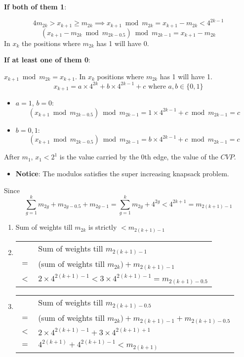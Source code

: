 \documentclass[article,10pt]{beamer}%
\begin{document}
\begin{frame}[allowframebreaks]
\begin{itemize}
	\end{itemize}
\framebreak

 \textbf{If both of them 1}:
 
  $$4m_{2k}>x_{k+1}\geq m_{2k}\implies x_{k+1}\bmod{m_{2k}}=x_{k+1}-m_{2k}<4^{2k-1}$$  $$(x_{k+1}-m_{2k}\bmod{m_{2k-0.5}})\bmod{m_{2k-1}}=x_{k+1}-m_{2k}$$ In $x_k$ the positions where $m_{2k}$ has 1 will have 0.
  \framebreak
  
\textbf{If at least one of them 0}:

 $x_{k+1}\bmod{m_{2k}}=x_{k+1}$. In $x_k$ positions where $m_{2k}$ has 1 will have 1. $$x_{k+1}=a\times 4^{2k}+b\times 4^{2k-1}+c\text{ where }a,b\in \{0,1\}$$\begin{itemize}
	\item $a=1$, $b=0$: $$(x_{k+1}\bmod{m_{2k-0.5}})\bmod{m_{2k-1}}=1\times 4^{2k-1}+c\bmod{m_{2k-1}}=c$$
	\item $b=0,1$: $$(x_{k+1}\bmod{m_{2k-0.5}})\bmod{m_{2k-1}}=b\times 4^{2k-1}+c\bmod{m_{2k-1}}=c$$
\end{itemize}
\framebreak

After $m_1$, $x_1<2^1$ is the value carried by the 0th edge, the value of the $CVP$.

\begin{itemize}
	\item  \textbf{Notice}: The modulos  satisfies the super increasing knapsack problem. 
\end{itemize} 
 Since $$\sum\limits_{g=1}^{k}m_{2g}+m_{2g-0.5}+m_{2g-1}=\sum\limits_{g=1}^{k}m_{2g}+4^{2g}<4^{2k+1}=m_{2(k+1)-1}$$ 
 \framebreak
 
	\begin{enumerate}
		\item \hspace{1ex} Sum of weights till $m_{2k}$ is strictly $<m_{2(k+1)-1}$
		\item \begin{tabular}[t]{rl}
			& Sum of weights till $m_{2(k+1)-1}$ \\ 
			$=$ &(sum of weights till $m_{2k})+m_{2(k+1)-1}$ \\
		 $<$ & $2\times 4^{2(k+1)-1}<3\times 4^{2(k+1)-1}=m_{2(k+1)-0.5}$
		\end{tabular}
		
		\item \begin{tabular}[t]{rl}
			& Sum of weights till $m_{2(k+1)-0.5}$ \\
			$=$ & (sum of weights till $m_{2k})+m_{2(k+1)-1}+m_{2(k+1)-0.5}$\\
			 $<$ & $2\times 4^{2(k+1)-1}+3\times 4^{2(k+1)+1}$\\
			 $=$ & $ 4^{2(k+1)}+4^{2(k+1)-1}<m_{2(k+1)}$
		\end{tabular}
	\end{enumerate}


\end{frame}
\end{document}
